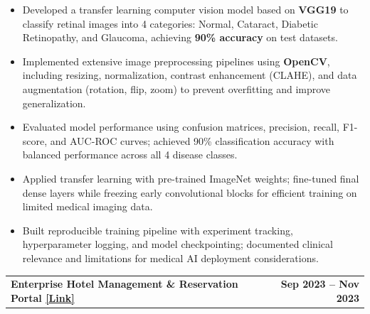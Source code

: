 \documentclass[10pt,a4paper]{article}
\makeatletter
\newcommand{\entry}[2]{%
    \noindent
    \begin{tabularx}{\linewidth}{@{}X r@{}}
        \textbf{#1} & \textbf{#2}
    \end{tabularx}
    \vspace{-2pt}
}
\makeatother
\begin{document}
\begin{itemize}

\item Developed a transfer learning computer vision model based on \textbf{VGG19} to classify retinal images into 4 categories: Normal, Cataract, Diabetic Retinopathy, and Glaucoma, achieving \textbf{90\% accuracy} on test datasets.

\item Implemented extensive image preprocessing pipelines using \textbf{OpenCV}, including resizing, normalization, contrast enhancement (CLAHE), and data augmentation (rotation, flip, zoom) to prevent overfitting and improve generalization.

\item Evaluated model performance using confusion matrices, precision, recall, F1-score, and AUC-ROC curves; achieved 90\% classification accuracy with balanced performance across all 4 disease classes.

\item Applied transfer learning with pre-trained ImageNet weights; fine-tuned final dense layers while freezing early convolutional blocks for efficient training on limited medical imaging data.

\item Built reproducible training pipeline with experiment tracking, hyperparameter logging, and model checkpointing; documented clinical relevance and limitations for medical AI deployment considerations.

\end{itemize}

\vspace{1pt}

\entry
{Enterprise Hotel Management \& Reservation Portal
\hspace{2pt}
\href{https://github.com/marideharshith21}
{\textcolor{linkblue}{[Link]}}}
{Sep 2023 -- Nov 2023}
\end{document}
